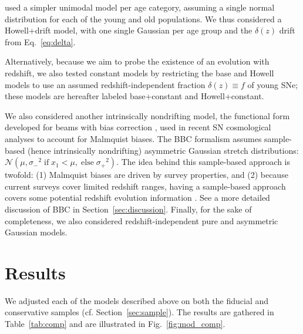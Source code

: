 \documentclass[]{aa}
\begin{document}
\cite{howell2007} used a simpler unimodal model per age category, assuming a
single normal distribution for each of the young and old populations. We thus
considered a Howell+drift model, with one single Gaussian per age group and
the $\delta(z)$ drift from Eq.~\ref{eq:delta}.

Alternatively, because we aim to probe the existence of an evolution with
redshift, we also tested constant models by restricting the base and
Howell models to use an assumed redshift-independent fraction $\delta(z)
\equiv f$ of young SNe; these models are hereafter labeled base+constant and
Howell+constant.

We also considered another intrinsically nondrifting model, the functional form
developed for beams with bias correction \cite[BBC,][]{scolnic2016,
kessler2017}, used in recent SN cosmological analyses
\cite[e.g.,][]{scolnic2018a, descosmopaper2019, riess2016, riess2019} to account
for Malmquist biases. The BBC formalism assumes sample-based (hence
intrinsically nondrifting) asymmetric Gaussian stretch distributions:
$\mathcal{N}\left(\mu, \sigma_-{}^2\; \text{if} \;x_1<\mu,\; \text{else}
\;\sigma_+{}^2\right)$. The idea behind this sample-based approach is twofold:
(1) Malmquist biases are driven by survey properties, and (2) because current
surveys cover limited redshift ranges, having a sample-based approach covers
some potential redshift evolution information \citep{scolnic2016, scolnic2018a}.
See a more detailed discussion of BBC in Section~\ref{sec:discussion}. Finally, for the sake of completeness, we also considered redshift-independent
pure and asymmetric Gaussian models. 

\section{Results}\label{sec:results}

We adjusted each of the models described above on both the fiducial and
conservative samples (cf. Section~\ref{sec:sample}). The results are gathered
in Table~\ref{tab:comp} and are illustrated in Fig.~\ref{fig:mod_comp}. 
\end{document}
